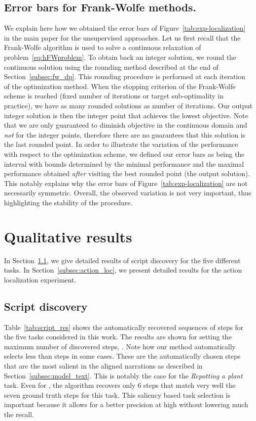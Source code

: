 \documentclass[10pt,twocolumn,letterpaper]{article}
\begin{document}
\subsection{Error bars for Frank-Wolfe methods.}
We explain here how we obtained the error bars of Figure~\ref{tab:exp-localization} in the main paper for the unsupervised approaches.
Let us first recall that the Frank-Wolfe algorithm is used to solve a continuous relaxation of problem~\eqref{eq:hFWproblem}.
To obtain back an integer solution, we round the continuous solution using the rounding method described at the end of Section~\ref{subsec:fw_dp}.
This rounding procedure is performed at each iteration of the optimization method.
When the stopping criterion of the Frank-Wolfe scheme is reached (fixed number of iterations or target sub-optimality in practice), we have as many rounded solutions as number of iterations.
Our output integer solution is then the integer point that achieves the lowest objective.
Note that we are only guaranteed to diminish objective in the continuous domain and \emph{not} for the integer points, therefore there are no guarantees that this solution is the last rounded point.
In order to illustrate the variation of the performance with respect to the optimization scheme, we defined our error bars as being the interval with bounds determined by the minimal performance and the maximal performance obtained \emph{after} visiting the best rounded point (the output solution).
This notably explains why the error bars of Figure~\ref{tab:exp-localization} are not necessarily symmetric.
Overall, the observed variation is not very important, thus highlighting the stability of the procedure.




\section{Qualitative results}
\label{sec:qual_res}

In Section~\ref{subsec:script_disc}, we give detailed results of script discovery for the five different tasks.
In Section~\ref{subsec:action_loc}, we present detailed results for the action localization experiment.

\subsection{Script discovery}
\label{subsec:script_disc}
Table~\ref{tab:script_res} shows the automatically recovered sequences of steps for the five tasks considered in this work. 
The results are shown for setting the maximum number of discovered steps, . 
        Note how our method automatically selects less than  steps in some cases.
         These are the automatically chosen  steps that are the most salient in the aligned narrations as described in Section~\ref{subsec:model_text}.  
		 This is notably the case for the {\em Repotting a plant} task. 
		 Even for , the algorithm recovers only 6 steps that match very well the seven ground truth steps for this task. 
		 This saliency based task selection is important because it allows for a better precision at high  without lowering much the recall.       
\end{document}
